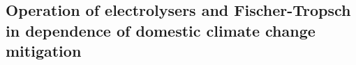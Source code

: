 



\subsection{Operation of electrolysers and Fischer-Tropsch in dependence of domestic climate change mitigation}


